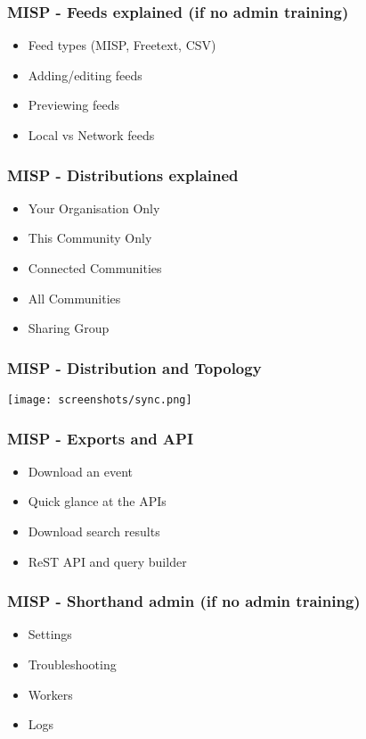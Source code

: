 \begin{frame}
    \frametitle{MISP - Feeds explained (if no admin training)}
    \begin{itemize}
        \item Feed types (MISP, Freetext, CSV)
        \item Adding/editing feeds
        \item Previewing feeds
        \item Local vs Network feeds
    \end{itemize}
\end{frame}

\begin{frame}
    \frametitle{MISP - Distributions explained}
    \begin{itemize}
        \item Your Organisation Only
        \item This Community Only
        \item Connected Communities
        \item All Communities
        \item Sharing Group
    \end{itemize}
\end{frame}

\begin{frame}
    \frametitle{MISP - Distribution and Topology}
    \texttt{[image: screenshots/sync.png]}
\end{frame}

\begin{frame}
    \frametitle{MISP - Exports and API}
    \begin{itemize}
        \item Download an event
        \item Quick glance at the APIs
        \item Download search results
        \item ReST API and query builder
    \end{itemize}
\end{frame}

\begin{frame}
    \frametitle{MISP - Shorthand admin (if no admin training)}
    \begin{itemize}
        \item Settings
        \item Troubleshooting
        \item Workers
        \item Logs
    \end{itemize}
\end{frame}
